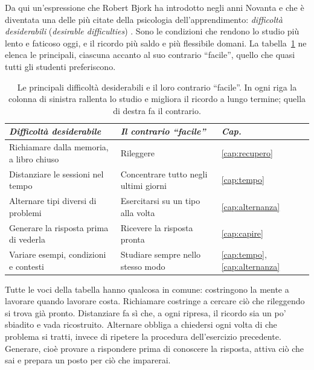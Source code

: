 Da qui un'espressione che Robert Bjork ha introdotto negli anni Novanta
e che è diventata una delle più citate della psicologia
dell'apprendimento: \emph{difficoltà desiderabili} (\emph{desirable
difficulties}) \parencite{bjork1994, bjork2011}. Sono le condizioni che
rendono lo studio più lento e faticoso oggi, e il ricordo più saldo e
più flessibile domani. La tabella~\ref{tab:difficolta} ne elenca le
principali, ciascuna accanto al suo contrario \enquote{facile}, quello
che quasi tutti gli studenti preferiscono.

\begin{table}[tbp]
  \centering\small
  \begin{tabular}{@{}>{\raggedright\arraybackslash}p{}>{\raggedright\arraybackslash}p{}l@{}}
    \toprule
    \textit{Difficoltà desiderabile} & \textit{Il contrario \enquote{facile}} & \textit{Cap.} \\
    \midrule
    Richiamare dalla memoria, a libro chiuso & Rileggere & \ref{cap:recupero} \\
    \addlinespace
    Distanziare le sessioni nel tempo & Concentrare tutto negli ultimi giorni & \ref{cap:tempo} \\
    \addlinespace
    Alternare tipi diversi di problemi & Esercitarsi su un tipo alla volta & \ref{cap:alternanza} \\
    \addlinespace
    Generare la risposta prima di vederla & Ricevere la risposta pronta & \ref{cap:capire} \\
    \addlinespace
    Variare esempi, condizioni e contesti & Studiare sempre nello stesso modo & \ref{cap:tempo}, \ref{cap:alternanza} \\
    \bottomrule
  \end{tabular}
  \caption{Le principali difficoltà desiderabili e il loro contrario
    \enquote{facile}. In ogni riga la colonna di sinistra rallenta lo
    studio e migliora il ricordo a lungo termine; quella di destra fa il
    contrario.}
  \label{tab:difficolta}
\end{table}

Tutte le voci della tabella hanno qualcosa in comune: costringono la
mente a lavorare quando lavorare costa. Richiamare costringe a cercare
ciò che rileggendo si trova già pronto. Distanziare fa sì che, a ogni
ripresa, il ricordo sia un po' sbiadito e vada ricostruito. Alternare
obbliga a chiedersi ogni volta di che problema si tratti, invece di
ripetere la procedura dell'esercizio precedente. Generare, cioè provare
a rispondere prima di conoscere la risposta, attiva ciò che sai e
prepara un posto per ciò che imparerai.

